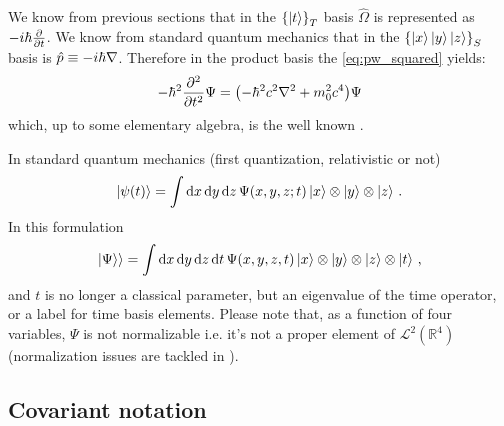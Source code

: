 We know from previous sections that in the $\qty{\ket{t}}_T$ basis $\hat{\Omega}$ is represented as
$-i\hbar\pdv{t}$. We know from standard quantum mechanics that in the $\qty{\ket{x}\ket{y}\ket{z}}_S$
basis is $\hat{p} \equiv -i\hbar\nabla$. Therefore in the product basis the \eqref{eq:pw_squared} yields:
\begin{equation}\label{eq:proto_kg}
  -\hbar^2\pdv[2]{t}\Psi = \qty(-\hbar^2 c^2 \nabla^2 + m_0^2 c^4)\Psi
\end{equation}
which, up to some elementary algebra, is the well known .

In standard quantum mechanics (first quantization, relativistic or not)
\begin{equation}
  \ket{\psi(t)} = \int \dd{x}\dd{y}\dd{z} \Psi(x,y,z;t) \ket{x}\otimes\ket{y}\otimes\ket{z} \,\text{.}
\end{equation}
In this formulation
\begin{equation}
  |\Psi\rangle\rangle = \int \dd{x}\dd{y}\dd{z}\dd{t} \Psi(x,y,z,t) \ket{x}\otimes\ket{y}\otimes\ket{z}\otimes\ket{t} \,\text{,}
\end{equation}
and $t$ is no longer a classical parameter, but an eigenvalue of the time operator,
or a label for time basis elements. Please note that, as a function of four variables,
$\Psi$ is not normalizable i.e. it's not a proper element of
$\mathcal{L}^2(\mathbb{R}^4)$
(normalization issues are tackled in \cite[eq. 23 and following]{Lloyd:Time}).

\subsection{Covariant notation}

